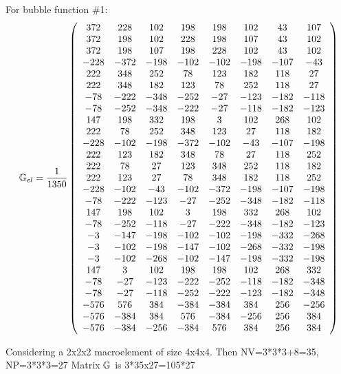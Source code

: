 For bubble function \#1:
\[
{\mathbb{G}}_{el}=
\frac{1}{1350}
\left(
\begin{array}{ccccccccc}
 372&  228&  102&  198&  198&  102&   43&  107\\
 372&  198&  102&  228&  198&  107&   43&  102\\
 372&  198&  107&  198&  228&  102&   43&  102\\
-228& -372& -198& -102& -102& -198& -107&  -43\\
 222&  348&  252&   78&  123&  182&  118&   27\\
 222&  348&  182&  123&   78&  252&  118&   27\\
 -78& -222& -348& -252&  -27& -123& -182& -118\\
 -78& -252& -348& -222&  -27& -118& -182& -123\\
 147&  198&  332&  198&    3&  102&  268&  102\\
 222&   78&  252&  348&  123&   27&  118&  182\\
-228& -102& -198& -372& -102&  -43& -107& -198\\
 222&  123&  182&  348&   78&   27&  118&  252\\
 222&   78&   27&  123&  348&  252&  118&  182\\
 222&  123&   27&   78&  348&  182&  118&  252\\
-228& -102&  -43& -102& -372& -198& -107& -198\\
 -78& -222& -123&  -27& -252& -348& -182& -118\\
 147&  198&  102&    3&  198&  332&  268&  102\\
 -78& -252& -118&  -27& -222& -348& -182& -123\\
  -3& -147& -198& -102& -102& -198& -332& -268\\
  -3& -102& -198& -147& -102& -268& -332& -198\\
  -3& -102& -268& -102& -147& -198& -332& -198\\
 147&    3&  102&  198&  198&  102&  268&  332\\
 -78&  -27& -123& -222& -252& -118& -182& -348\\
 -78&  -27& -118& -252& -222& -123& -182& -348\\
-576&  576&  384& -384& -384&  384&  256& -256\\
-576& -384&  384&  576& -384& -256&  256&  384\\
-576& -384& -256& -384&  576&  384&  256&  384
\end{array}
\right)
\]

Considering a 2x2x2 macroelement of size 4x4x4. 
Then NV=3*3*3+8=35, NP=3*3*3=27
Matrix ${\mathbb{G}}$ is 3*35x27=105*27

